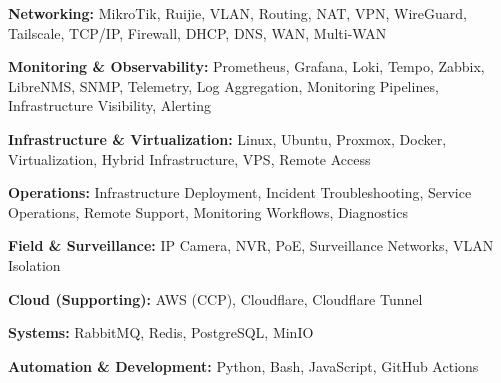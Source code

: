 \textbf{Networking:} MikroTik, Ruijie, VLAN, Routing, NAT, VPN, WireGuard, Tailscale, TCP/IP, Firewall, DHCP, DNS, WAN, Multi-WAN\par
\textbf{Monitoring \& Observability:} Prometheus, Grafana, Loki, Tempo, Zabbix, LibreNMS, SNMP, Telemetry, Log Aggregation, Monitoring Pipelines, Infrastructure Visibility, Alerting\par
\textbf{Infrastructure \& Virtualization:} Linux, Ubuntu, Proxmox, Docker, Virtualization, Hybrid Infrastructure, VPS, Remote Access\par
\textbf{Operations:} Infrastructure Deployment, Incident Troubleshooting, Service Operations, Remote Support, Monitoring Workflows, Diagnostics\par
\textbf{Field \& Surveillance:} IP Camera, NVR, PoE, Surveillance Networks, VLAN Isolation\par
\textbf{Cloud (Supporting):} AWS (CCP), Cloudflare, Cloudflare Tunnel\par
\textbf{Systems:} RabbitMQ, Redis, PostgreSQL, MinIO\par
\textbf{Automation \& Development:} Python, Bash, JavaScript, GitHub Actions
